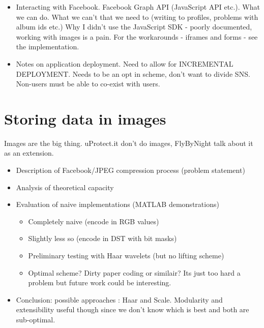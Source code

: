 \begin{itemize}
    \item Interacting with Facebook. Facebook Graph API (JavaScript API etc.). What we can do. What we can't that we need to (writing to profiles, problems with album ids etc.) Why I didn't use the JavaScript SDK - poorly documented, working with images is a pain. For the workarounds - iframes and forms - see the implementation.

    \item Notes on application deployment. Need to allow for INCREMENTAL DEPLOYMENT. Needs to be an opt in scheme, don't want to divide SNS. Non-users must be able to co-exist with users.


\end{itemize}
    
\section{Storing data in images}
    Images are the big thing. uProtect.it don't do images, FlyByNight talk about it as an extension.
    \begin{itemize}
	\item Description of Facebook/JPEG compression process (problem statement)
	\item Analysis of theoretical capacity
	\item Evaluation of naive implementations (MATLAB demonstrations)
            \begin{itemize}
		\item Completely naive (encode in RGB values)
		\item Slightly less so (encode in DST with bit masks)
                \item Preliminary testing with Haar wavelets (but no lifting scheme)
                \item Optimal scheme? Dirty paper coding or similair? Its just too hard a problem but future work could be interesting.
             \end{itemize}
	\item Conclusion: possible approaches : Haar and Scale. Modularity and extensibility useful though since we don't know which is best and both are sub-optimal.
    \end{itemize}
    
